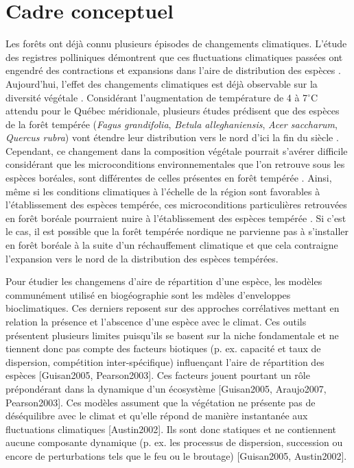 \section*{Cadre conceptuel}

Les forêts ont déjà connu plusieurs épisodes de changements climatiques. L'étude des registres
polliniques démontrent que ces fluctuations climatiques passées ont engendré des contractions et
expansions dans l'aire de distribution des espèces \citep{Davis2001}. Aujourd'hui, l'effet
des changements climatiques est déjà observable sur la diversité végétale
\citep{Walther2002a,Parmesan2006}. Considérant l'augmentation de température de 4 à 7$^\circ$C
\citep[Scénario RCP 8.5]{Climatique2015} attendu pour le Québec méridionale, plusieurs études
prédisent que des espèces de la forêt tempérée (\textit{Fagus grandifolia}, \textit{Betula
alleghaniensis}, \textit{Acer saccharum}, \textit{Quercus rubra}) vont étendre leur distribution
vers le nord d'ici la fin du siècle \citep{Iverson2002,Sciences2014}. Cependant, ce changement dans
la composition végétale pourrait s'avérer difficile considérant que les microconditions
environnementales que l’on retrouve sous les espèces boréales, sont différentes de celles présentes
en forêt tempérée \citep{Barras1998,Caspersen2005}. Ainsi, même si les conditions climatiques à
l'échelle de la région sont favorables à l'établissement des espèces tempérée, ces microconditions
particulières retrouvées en forêt boréale pourraient nuire à l'établissement des espèces tempérée
\citep{DeFrenne2013,Lafleur2010}. Si c’est le cas, il est possible que la forêt tempérée nordique ne
parvienne pas à s'installer en forêt boréale à la suite d’un réchauffement climatique et que cela
contraigne l'expansion vers le nord de la distribution des espèces tempérées.

Pour étudier les changemens d'aire de répartition d'une espèce, les modèles communément utilisé en
biogéographie sont les mdèles d'enveloppes bioclimatiques. Ces derniers reposent sur des approches
corrélatives mettant en relation la présence et l'abscence d'une espèce avec le climat. Ces outils
présentent plusieurs limites puisqu'ils se basent sur la niche fondamentale et ne tiennent donc pas
compte des facteurs biotiques (p. ex. capacité et taux de dispersion, compétition inter-spécifique)
influençant l'aire de répartition des espèces [Guisan2005, Pearson2003]. Ces facteurs jouent
pourtant un rôle prépondérant dans la dynamique d’un écosystème [Guisan2005, Araujo2007,
Pearson2003]. Ces modèles assument que la végétation ne présente pas de déséquilibre avec
le climat et qu'elle répond de manière instantanée aux fluctuations climatiques [Austin2002]. Ils
sont donc statiques et ne contiennent aucune composante dynamique (p. ex. les processus de
dispersion, succession ou encore de perturbations tels que le feu ou le broutage) [Guisan2005,
Austin2002].


